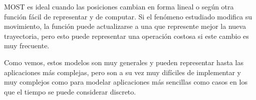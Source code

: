 MOST es ideal cuando las posiciones cambian en forma lineal o según otra función fácil de representar y de computar. Si el fenómeno estudiado modifica su movimiento, la función puede actualizarse a una que represente mejor la nueva trayectoria, pero esto puede representar una operación costosa si este cambio es muy frecuente.

Como vemos, estos modelos son muy generales y pueden representar hasta las aplicaciones más complejas, pero son a su vez muy difíciles de implementar y muy complejos como para modelar aplicaciones más sencillas como casos en los que el tiempo se puede considerar discreto.
